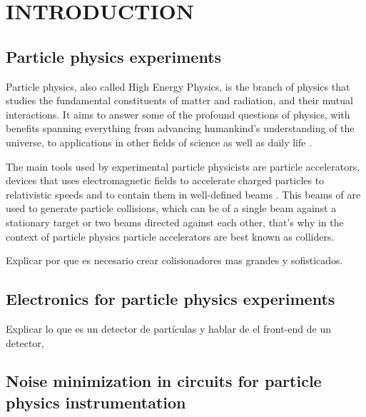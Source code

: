 \chapter{INTRODUCTION}
\label{chapter:introduction}
\section{Particle physics experiments}
Particle physics, also called High Energy Physics, is the branch of physics that studies the fundamental constituents of matter and radiation, and their mutual interactions. It aims to answer some of the profound questions of physics, with benefits spanning everything from advancing humankind’s understanding of the universe, to applications in other fields of science as well as daily life \citep{tuttle101}.

The main tools used by experimental particle physicists are particle accelerators, devices that uses electromagnetic fields to accelerate charged particles to relativistic speeds and to contain them in  well-defined beams \citep{livingston1962particle}. This beams of are used to generate particle collisions, which can be of a single beam against a stationary target or two beams directed against each other, that's why in the context of particle physics particle accelerators are best known as colliders. 



Explicar por que es necesario crear colisionadores mas grandes y sofisticados.\\

\section{Electronics for particle physics experiments}

Explicar lo que es un detector de partículas y hablar de el front-end de un detector, 


\section{Noise minimization in circuits for particle physics instrumentation}

